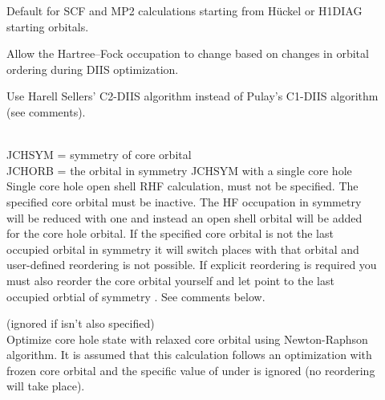 \begin{description}
\item[]
  Default for SCF and
  MP2 calculations
  starting from H\"{u}ckel or H1DIAG
  starting orbitals.

  Allow the Hartree--Fock
occupation to
  change based on changes in
  orbital ordering during DIIS optimization.

\item[]
  Use Harell Sellers' C2-DIIS algorithm instead of Pulay's C1-DIIS algorithm
  (see comments).

\item[]
   \\
  JCHSYM = symmetry of core orbital\\
  JCHORB = the orbital in symmetry JCHSYM with a single core hole\\
  Single core hole open shell RHF calculation,  must not
  be specified.  The specified core orbital must be
  inactive.
  The HF occupation in symmetry  will be reduced with one
  and instead an
  open shell orbital will be added for the core hole orbital.
  If the specified core orbital is not the last occupied orbital in symmetry
   it will switch places with that orbital and user-defined reordering
  is not possible.
  If explicit reordering is required you must also reorder
  the core orbital yourself and let  point to the last occupied orbtial
  of symmetry .  See comments below.

\item[]
  (ignored if  isn't also specified)\\
  Optimize core hole state with relaxed
  core orbital using Newton-Raphson algorithm.
  It is assumed that this calculation follows an optimization
  with frozen core orbital and the specific value of
   under  is ignored (no
  reordering will take place).



\end{description}
